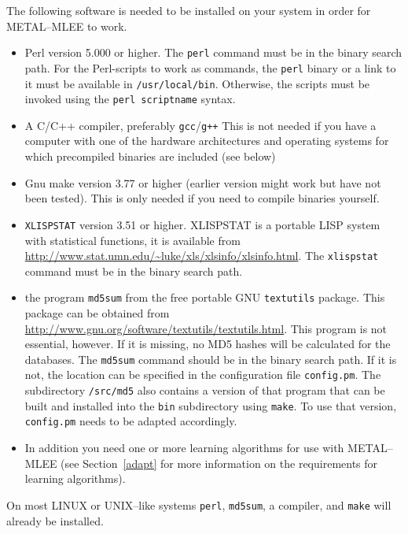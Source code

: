 \documentclass[a4paper,10pt,twoside]{article}
\newcommand{\eenameshort}{\textsf{METAL--MLEE}}
\begin{document}
The following software is needed to be installed on your system in order
for \eenameshort{} to work. 
\begin{itemize}
\item Perl version 5.000 or higher. The \texttt{perl}
  command must be in the binary search path. For the Perl-scripts
  to work as commands, the \texttt{perl} binary or a link to it must be
  available in \texttt{/usr/local/bin}. Otherwise, the scripts
  must be invoked using the \texttt{perl scriptname} syntax.
\item A C/C++ compiler, preferably \texttt{gcc}/\texttt{g++}
  This is not needed if you have a computer with one of the
  hardware architectures and operating systems for which
  precompiled binaries are included (see below)
\item Gnu make version 3.77 or higher (earlier version might work 
  but have not been tested). This is only needed if you need 
  to compile binaries yourself.
\item \texttt{XLISPSTAT} version 3.51 or higher. 
XLISPSTAT is a portable LISP system with statistical 
functions, it is available from
\url{http://www.stat.umn.edu/~luke/xls/xlsinfo/xlsinfo.html}. The 
\texttt{xlispstat} command must be in the binary search path.

\item the program \texttt{md5sum} from the free portable GNU \texttt{textutils}
package. This package can be obtained from \url{http://www.gnu.org/software/textutils/textutils.html}.  This program is not essential, however.
If it is missing, no MD5 hashes will be calculated for the
databases. The \texttt{md5sum} command should be in the binary
search path. If it is not, the location can be specified in
the configuration file \texttt{config.pm}.
The subdirectory \texttt{/src/md5} also contains a version of that
program that can be built and installed into the \texttt{bin}
subdirectory using \texttt{make}. To use that version, \texttt{config.pm}
needs to be adapted accordingly.
\item In addition you need one or more learning algorithms for
use with \eenameshort{} (see Section~\ref{adapt} for more information
on the requirements for learning algorithms).

\end{itemize}



On most LINUX or UNIX--like systems \texttt{perl}, \texttt{md5sum}, a compiler,
and \texttt{make} will already be installed. 
\end{document}
